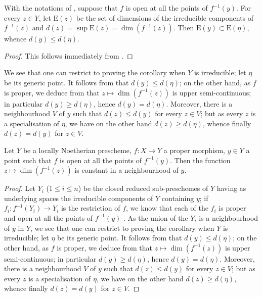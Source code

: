 \begin{corollary}[14.2.4]
\label{IV.14.2.4}
With the notations of , suppose that $f$ is open at all the points of $f^{-1}(y)$.
For every $z\in Y$, let $\mathrm{E}(z)$ be the set of dimensions of the irreducible components of $f^{-1}(z)$ and $d(z)=\sup\mathrm{E}(z)=\dim(f^{-1}(z))$.
Then $\mathrm{E}(y)\subset\mathrm{E}(\eta)$, whence $d(y)\leq d(\eta)$.
\end{corollary}

\begin{proof}
This follows immediately from .
\end{proof}


We see that one can restrict to proving the corollary when $Y$ is irreducible; let $\eta$ be its generic point.
It follows from  that $d(y)\leq d(\eta)$; on the other hand, as $f$ is proper, we deduce from  that $z\mapsto\dim(f^{-1}(z))$ is upper semi-continuous; in particular $d(y)\geq d(\eta)$, hence $d(y)=d(\eta)$.
Moreover, there is a neighbourhood $V$ of $y$ such that $d(z)\leq d(y)$ for every $z\in V$; but as every $z$ is a specialisation of $\eta$, we have on the other hand $d(z)\geq d(\eta)$, whence finally $d(z)=d(y)$ for $z\in V$.

\begin{corollary}[14.2.5]
\label{IV.14.2.5}
Let $Y$ be a locally Noetherian prescheme, $f:X\to Y$ a proper morphism, $y\in Y$ a point such that $f$ is open at all the points of $f^{-1}(y)$.
Then the function $z\mapsto\dim(f^{-1}(z))$ is constant in a neighbourhood of $y$.
\end{corollary}

\begin{proof}
Let $Y_i$ ($1\leq i\leq n$) be the closed reduced sub-preschemes of $Y$ having as underlying spaces the irreducible components of $Y$ containing $y$; if $f_i:f^{-1}(Y_i)\to Y_i$ is the restriction of $f$, we know that each of the $f_i$ is proper  and open at all the points of $f^{-1}(y)$ .
As the union of the $Y_i$ is a neighbourhood of $y$ in $Y$, we see that one can restrict to proving the corollary when $Y$ is irreducible; let $\eta$ be its generic point.
It follows from  that $d(y)\leq d(\eta)$; on the other hand, as $f$ is proper, we deduce from  that $z\mapsto\dim(f^{-1}(z))$ is upper semi-continuous; in particular $d(y)\geq d(\eta)$, hence $d(y)=d(\eta)$.
Moreover, there is a neighbourhood $V$ of $y$ such that $d(z)\leq d(y)$ for every $z\in V$; but as every $z$ is a specialisation of $\eta$, we have on the other hand $d(z)\geq d(\eta)$, whence finally $d(z)=d(y)$ for $z\in V$.
\end{proof}

